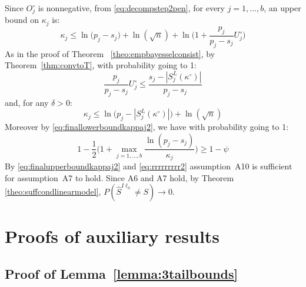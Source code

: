 \documentclass[aos]{imsart}
\theoremstyle{plain}
\begin{document}
Since $O_j^{\circ}$ is nonnegative, from \eqref{eq:decompstep2pen}, for every $j=1,\ldots,b$, an upper bound on $\kappa_j$ is:
\begin{equation*}
    \kappa_j \leq \ln\big(p_j-s_j\big)+\ln(\sqrt{n})+\ln\bigg(1+\frac{p_j}{p_j-s_j}U^{\circ}_j\bigg)
\end{equation*}
As in the proof of Theorem ~\ref{theo:empbayesselconsist}, by Theorem~\ref{thm:convtoT}, with probability going to 1:
\begin{equation*}
    \frac{p_j}{p_j-s_j}U^{\circ}_j \leq \frac{s_j-|S^L_j(\kappa^{\circ})|}{p_j-s_j}
\end{equation*}
and, for any $\delta >0$:
\begin{equation}\label{eq:finalupperboundkappaj2}
\kappa_j \leq \ln\big(p_j-|S^L_j(\kappa^{\circ})|\big)+\ln(\sqrt{n})
\end{equation}
Moreover by \eqref{eq:finallowerboundkappaj2}, we have with probability going to 1:
\begin{equation}\label{eq:rrrrrrrrr2}
    1-\frac12\Big(1+\max_{j=1, \ldots,b}\frac{\ln(p_j-s_j)}{\kappa_j}\Big) \geq 1-\psi
\end{equation}
By \eqref{eq:finalupperboundkappaj2} and \eqref{eq:rrrrrrrrr2} assumption~A10 is sufficient for assumption~A7 to hold. Since A6 and A7 hold, by Theorem \ref{theo:suffcondlinearmodel}, $P(\hat{S}^{I\ell_0}\neq S) \to 0$.

\section{Proofs of auxiliary results}\label{sec:proofauxi}

\subsection{Proof of Lemma~\ref{lemma:3tailbounds}}
\end{document}
